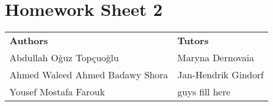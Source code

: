 \documentclass{article}
\begin{document}
\section*{\huge Homework Sheet 2}
\begin{flushright}
  \begin{tabular}{@{} l l @{}}
    \textbf{Authors} & \textbf{Tutors} \\
    Abdullah Oğuz Topçuoğlu & Maryna Dernovaia \\
    Ahmed Waleed Ahmed Badawy Shora & Jan-Hendrik Gindorf \\
    Yousef Mostafa Farouk & guys fill here \\
  \end{tabular}
\end{flushright}

\end{document}
